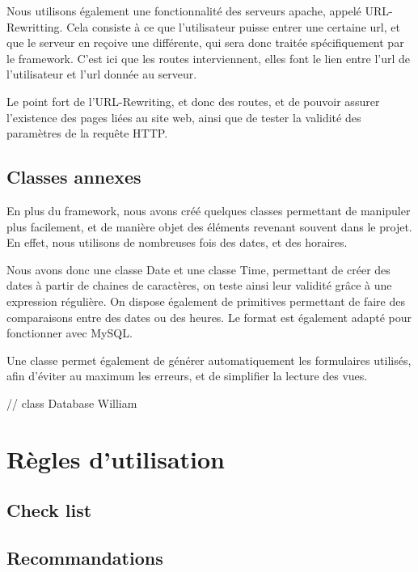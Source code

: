 Nous utilisons également une fonctionnalité des serveurs apache, appelé URL-Rewritting. Cela consiste à ce que l'utilisateur
puisse entrer une certaine url, et que le serveur en reçoive une différente, qui sera donc traitée spécifiquement par le framework.
C'est ici que les routes interviennent, elles font le lien entre l'url de l'utilisateur et l'url donnée au serveur.

Le point fort de l'URL-Rewriting, et donc des routes, et de pouvoir assurer l'existence des pages liées au site web,
ainsi que de tester la validité des paramètres de la requête HTTP.

        \subsection{Classes annexes}

En plus du framework, nous avons créé quelques classes permettant de manipuler plus facilement, et de manière objet
des éléments revenant souvent dans le projet. En effet, nous utilisons de nombreuses fois des dates, et des horaires.

Nous avons donc une classe Date et une classe Time, permettant de créer des dates à partir de chaines de caractères,
on teste ainsi leur validité grâce à une expression régulière. On dispose également de primitives permettant de
faire des comparaisons entre des dates ou des heures. Le format est également adapté pour fonctionner avec MySQL.

Une classe permet également de générer automatiquement les formulaires utilisés, afin d'éviter au maximum les erreurs,
et de simplifier la lecture des vues.

// class Database William

        \cite{ref_framework_mvc}

    \section{Règles d'utilisation}

        \subsection{Check list}



        \subsection{Recommandations}


